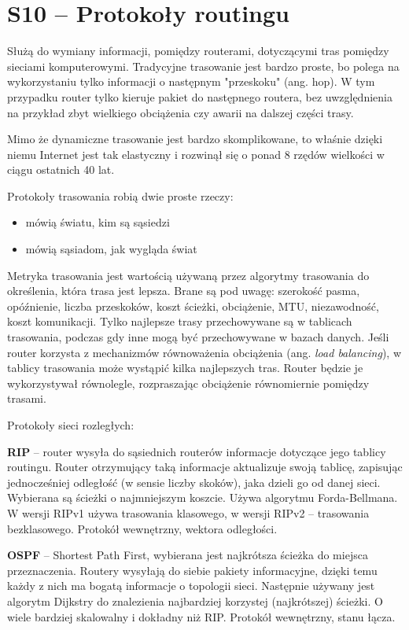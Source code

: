 \section{S10 -- Protokoły routingu}

Służą do wymiany informacji, pomiędzy routerami, dotyczącymi tras pomiędzy sieciami komputerowymi. Tradycyjne trasowanie jest bardzo proste, bo polega na wykorzystaniu tylko informacji o następnym "przeskoku" (ang. hop). W tym przypadku router tylko kieruje pakiet do następnego routera, bez uwzględnienia na przykład zbyt wielkiego obciążenia czy awarii na dalszej części trasy.

Mimo że dynamiczne trasowanie jest bardzo skomplikowane, to właśnie dzięki niemu Internet jest tak elastyczny i rozwinął się o ponad 8 rzędów wielkości w ciągu ostatnich 40 lat.

Protokoły trasowania robią dwie proste rzeczy:
\begin{itemize}
	\setlength\itemsep{1pt}
	\item mówią światu, kim są sąsiedzi
	\item mówią sąsiadom, jak wygląda świat
\end{itemize}

Metryka trasowania jest wartością używaną przez algorytmy trasowania do określenia, która trasa jest lepsza. Brane są pod uwagę: szerokość pasma, opóźnienie, liczba przeskoków, koszt ścieżki, obciążenie, MTU, niezawodność, koszt komunikacji. Tylko najlepsze trasy przechowywane są w tablicach trasowania, podczas gdy inne mogą być przechowywane w bazach danych. Jeśli router korzysta z mechanizmów równoważenia obciążenia (ang. \textit{load balancing}), w tablicy trasowania może wystąpić kilka najlepszych tras. Router będzie je wykorzystywał równolegle, rozpraszając obciążenie równomiernie pomiędzy trasami.

Protokoły sieci rozległych:

\textbf{RIP} – router wysyła do sąsiednich routerów informacje dotyczące jego tablicy routingu. Router otrzymujący taką informacje aktualizuje swoją tablicę, zapisując jednocześniej odległość (w sensie liczby skoków), jaka dzieli go od danej sieci. Wybierana są ścieżki o najmniejszym koszcie. Używa algorytmu Forda-Bellmana. W wersji RIPv1 używa trasowania klasowego, w wersji RIPv2 – trasowania bezklasowego. Protokół wewnętrzny, wektora odległości.

\textbf{OSPF} – Shortest Path First, wybierana jest najkrótsza ścieżka do miejsca przeznaczenia. Routery wysyłają do siebie pakiety informacyjne, dzięki temu każdy z nich ma bogatą informacje o topologii sieci. Następnie używany jest algorytm Dijkstry do znalezienia najbardziej korzystej (najkrótszej) ścieżki. O wiele bardziej skalowalny i dokładny niż RIP. Protokół wewnętrzny, stanu łącza.

